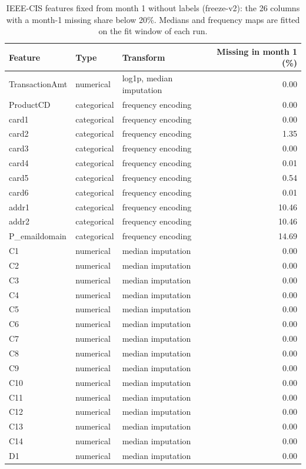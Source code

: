\begin{table}[t]
\centering
\footnotesize
\caption{IEEE-CIS features fixed from month 1 without labels (freeze-v2): the 26 columns with a month-1 missing share below 20\%. Medians and frequency maps are fitted on the fit window of each run.}
\label{tab:ieee-features}
\begin{tabular}{lllr}
\toprule
Feature & Type & Transform & Missing in month 1 (\%) \\
\midrule
TransactionAmt & numerical & log1p, median imputation & 0.00 \\
ProductCD & categorical & frequency encoding & 0.00 \\
card1 & categorical & frequency encoding & 0.00 \\
card2 & categorical & frequency encoding & 1.35 \\
card3 & categorical & frequency encoding & 0.00 \\
card4 & categorical & frequency encoding & 0.01 \\
card5 & categorical & frequency encoding & 0.54 \\
card6 & categorical & frequency encoding & 0.01 \\
addr1 & categorical & frequency encoding & 10.46 \\
addr2 & categorical & frequency encoding & 10.46 \\
P\_emaildomain & categorical & frequency encoding & 14.69 \\
C1 & numerical & median imputation & 0.00 \\
C2 & numerical & median imputation & 0.00 \\
C3 & numerical & median imputation & 0.00 \\
C4 & numerical & median imputation & 0.00 \\
C5 & numerical & median imputation & 0.00 \\
C6 & numerical & median imputation & 0.00 \\
C7 & numerical & median imputation & 0.00 \\
C8 & numerical & median imputation & 0.00 \\
C9 & numerical & median imputation & 0.00 \\
C10 & numerical & median imputation & 0.00 \\
C11 & numerical & median imputation & 0.00 \\
C12 & numerical & median imputation & 0.00 \\
C13 & numerical & median imputation & 0.00 \\
C14 & numerical & median imputation & 0.00 \\
D1 & numerical & median imputation & 0.00 \\
\bottomrule
\end{tabular}
\end{table}
